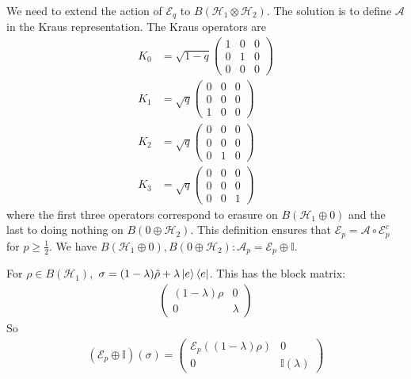\documentclass[../../note.tex]{subfiles}
\begin{document}
\begin{enumerate}
    We need to extend the action of $\mathcal{E}_q$ to $B(\mathcal{H}_1 \otimes \mathcal{H}_2)$. The solution is to define $\mathcal{A}$ in the Kraus representation. The Kraus operators are 
    \begin{align}
       K_0 &= \sqrt{1-q}\begin{pmatrix}
        1 & 0 & 0\\
        0 & 1 & 0 \\
        0 & 0 & 0
        \end{pmatrix} \\
        K_1 &= \sqrt{q}\begin{pmatrix}
        0 & 0 & 0\\
        0 & 0 & 0 \\
        1 & 0 & 0
        \end{pmatrix} \\
        K_2 &= \sqrt{q}\begin{pmatrix}
        0 & 0 & 0\\
        0 & 0 & 0 \\
        0 & 1 & 0
        \end{pmatrix} \\
        K_3 &= \sqrt{q}\begin{pmatrix}
        0 & 0 & 0\\
        0 & 0 & 0 \\
        0 & 0 & 1
        \end{pmatrix}
    \end{align}
    where the first three operators correspond to erasure on $B(\mathcal{H}_1 \oplus 0)$ and the last to doing nothing on $B(0 \oplus \mathcal{H}_2)$. This definition ensures that $\mathcal{E}_p = \mathcal{A} \circ \mathcal{E}_p^c $ for $p \geq \frac{1}{2}$.  We have $B(\mathcal{H}_1 \oplus 0), B(0\oplus \mathcal{H}_2): \mathcal{A}_p = \mathcal{E}_p \oplus \mathbb{I}$.
    
    For $\rho \in B(\mathcal{H}_1),$ $\sigma = (1-\lambda) \tilde{\rho} + \lambda \ket{e}\bra{e}$. This has the block matrix:
    \begin{align}
        \begin{pmatrix}
        (1-\lambda)\rho & 0 \\
        0 & \lambda
        \end{pmatrix}
    \end{align}
    So 
    \begin{align}
        (\mathcal{E}_p \oplus \mathbb{I})(\sigma) = \begin{pmatrix}
        \mathcal{E}_p((1-\lambda)\rho) & 0 \\
        0 & \mathbb{I}(\lambda)
        \end{pmatrix}
    \end{align}
    

\end{enumerate}
\end{document}
